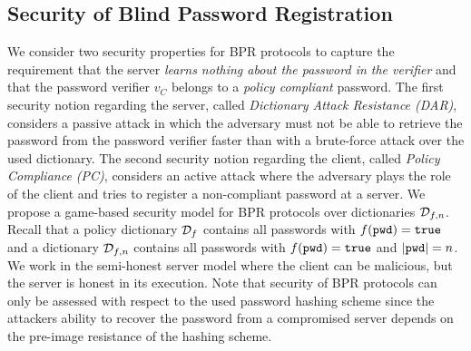 \subsection{Security of Blind Password Registration} \label{sec:bpr-model}
We consider two security properties for BPR protocols to capture the requirement that the server \emph{learns nothing about the password in the verifier} and that the password verifier $v_C$ belongs to a \emph{policy compliant} password.
The first security notion regarding the server, called \emph{Dictionary Attack Resistance (DAR)}, considers a passive attack in which the adversary must not be able to retrieve the password from the password verifier faster than with a brute-force attack over the used dictionary.
The second security notion regarding the client, called \emph{Policy Compliance (PC)}, considers an active attack where the adversary plays the role of the client and tries to register a non-compliant password at a server.
We propose a game-based security model for BPR protocols over dictionaries $\mathcal{D}_{f,n}$.
Recall that a policy dictionary $\mathcal{D}_f$ contains all passwords \pwd with $f(\mathtt{pwd})=\mathtt{true}$ and a dictionary $\mathcal{D}_{f,n}$ contains all passwords \pwd with $f(\mathtt{pwd})=\mathtt{true}$ and $|\mathtt{pwd}|=n$.
We work in the semi-honest server model where the client can be malicious, but the server is honest in its execution.
Note that security of BPR protocols can only be assessed with respect to the used password hashing scheme \HashP since the attackers ability to recover the password from a compromised server depends on the pre-image resistance of the hashing scheme.

